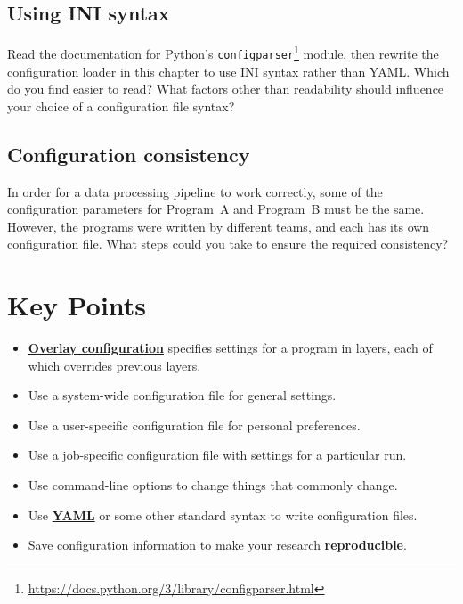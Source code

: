 \documentclass[
]{krantz}
\providecommand{\tightlist}{%
  \setlength{\itemsep}{0pt}\setlength{\parskip}{0pt}}
\renewcommand{\href}[2]{#2\footnote{\url{#1}}}
\newcommand{\gref}[2]{\hyperlink{#2}{\textbf{#1}}}
\begin{document}
\hypertarget{config-ex-ini}{%
\subsection{Using INI syntax}\label{config-ex-ini}}

Read the documentation for Python's \href{https://docs.python.org/3/library/configparser.html}{\texttt{configparser}} module,
then rewrite the configuration loader in this chapter to use INI syntax rather than YAML.
Which do you find easier to read?
What factors other than readability should influence your choice of a configuration file syntax?

\hypertarget{config-ex-consistency}{%
\subsection{Configuration consistency}\label{config-ex-consistency}}

In order for a data processing pipeline to work correctly,
some of the configuration parameters for Program~A and Program~B must be the same.
However,
the programs were written by different teams,
and each has its own configuration file.
What steps could you take to ensure the required consistency?

\hypertarget{config-keypoints}{%
\section{Key Points}\label{config-keypoints}}

\begin{itemize}
\tightlist
\item
  \gref{Overlay configuration}{overlay\_configuration} specifies settings for a program in layers,
  each of which overrides previous layers.
\item
  Use a system-wide configuration file for general settings.
\item
  Use a user-specific configuration file for personal preferences.
\item
  Use a job-specific configuration file with settings for a particular run.
\item
  Use command-line options to change things that commonly change.
\item
  Use \gref{YAML}{yaml} or some other standard syntax to write configuration files.
\item
  Save configuration information to make your research \gref{reproducible}{reproducible\_research}.
\end{itemize}
\end{document}
